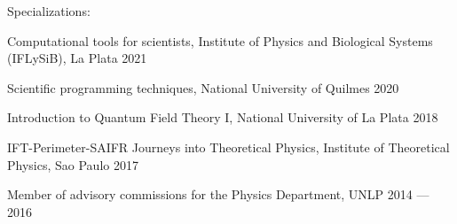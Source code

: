 Specializations:
\begin{zitemize}\vspace{-0.2 cm}


\item[\empty] Computational tools for scientists, Institute of Physics and Biological Systems (IFLySiB), La Plata \hfill 2021

\item[\empty] Scientific programming techniques, National University of Quilmes \hfill 2020

\item[\empty] Introduction to Quantum Field Theory I, National University of La Plata \hfill 2018

\item[\empty] IFT-Perimeter-SAIFR Journeys into Theoretical Physics, Institute of Theoretical Physics, Sao Paulo \hfill 2017
\end{zitemize}

Member of advisory commissions for the Physics Department, UNLP \hspace{7.2 cm} 2014 --- 2016 
